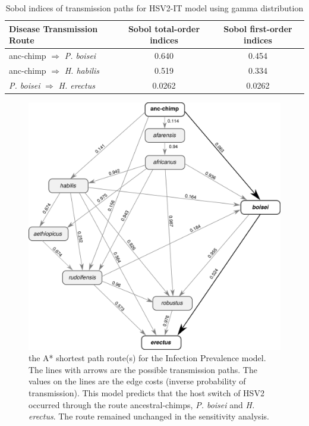 \documentclass[fleqn,10pt]{wlscirep}
\begin{document}
\begin{table}
\caption{Sobol indices of transmission paths for HSV2-IT model using gamma distribution}
\centering
\renewcommand{\arraystretch}{1.5}
\label{table:sobol}
\begin{tabulary}{\linewidth}{LCC}
\toprule
Disease Transmission Route & 
Sobol total-order indices & 
Sobol first-order indices \\ 
\midrule
anc-chimp $\Rightarrow$ \textit{P. boisei} & 0.640 & 0.454\\


anc-chimp $\Rightarrow$ \textit{H. habilis} & 0.519 & 0.334 \\

\textit{P. boisei} $\Rightarrow$ \textit{H. erectus} & 0.0262 & 0.0262 \\
\bottomrule
\end{tabulary}
\end{table}

\begin{figure}
  \centering
  \includegraphics[width=\textwidth]{figs/dag-ip}
  \caption{the A* shortest path route(s) for the Infection Prevalence model. The lines with arrows are the possible transmission paths. The values on the lines are the edge costs (inverse probability of transmission). This model predicts that the host switch of HSV2 occurred through the route ancestral-chimps, \textit{P. boisei} and \textit{H. erectus}. The route remained unchanged in the sensitivity analysis.}
  \label{fig:dag-ip}   
\end{figure}  
\end{document}
